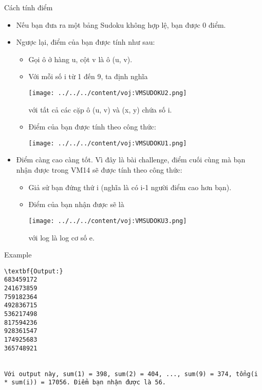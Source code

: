 Cách tính điểm
\begin{itemize}
	\item Nếu bạn đưa ra một bảng Sudoku không hợp lệ, bạn được 0 điểm.
	\item Ngược lại, điểm của bạn được tính như sau:
\begin{itemize}
	\item Gọi ô ở hàng u, cột v là ô (u, v).
	\item Với mỗi số i từ 1 đến 9, ta định nghĩa



\texttt{[image: ../../../content/voj:VMSUDOKU2.png]}


với tất cả các cặp ô (u, v) và (x, y) chứa số i.
	\item Điểm của bạn được tính theo công thức:



\texttt{[image: ../../../content/voj:VMSUDOKU1.png]}
\end{itemize}
	\item Điểm càng cao càng tốt. Vì đây là bài challenge, điểm cuối cùng mà bạn nhận được trong VM14 sẽ được tính theo công thức:
\begin{itemize}
	\item Giả sử bạn đứng thứ i (nghĩa là có i-1 người điểm cao hơn bạn).
	\item Điểm của bạn nhận được sẽ là



\texttt{[image: ../../../content/voj:VMSUDOKU3.png]}


với log là log cơ số e.
\end{itemize}
\end{itemize}
Example
\begin{verbatim}
\textbf{Output:}
683459172
241673859
759182364
492836715
536217498
817594236
928361547
174925683
365748921


Với output này, sum(1) = 398, sum(2) = 404, ..., sum(9) = 374, tổng(i * sum(i)) = 17056. Điểm bạn nhận được là 56.
\end{verbatim}